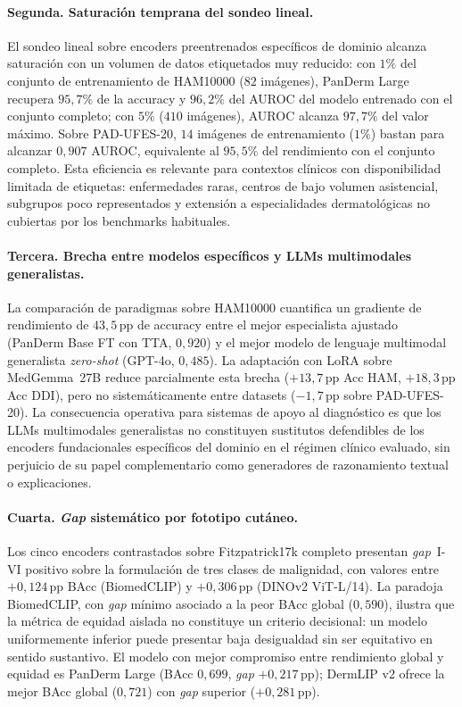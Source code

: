 \paragraph{Segunda. Saturación temprana del sondeo lineal.}
El sondeo lineal sobre encoders preentrenados específicos de
dominio alcanza saturación con un volumen de datos etiquetados muy
reducido: con $1\%$ del conjunto de entrenamiento de HAM10000
($82$ imágenes), PanDerm Large recupera $95{,}7\%$ de la
accuracy y $96{,}2\%$ del AUROC del modelo entrenado con el
conjunto completo; con $5\%$ ($410$ imágenes), AUROC alcanza
$97{,}7\%$ del valor máximo. Sobre PAD-UFES-20, $14$ imágenes
de entrenamiento ($1\%$) bastan para alcanzar $0{,}907$
AUROC, equivalente al $95{,}5\%$ del rendimiento con el conjunto
completo. Esta eficiencia es relevante para contextos clínicos con
disponibilidad limitada de etiquetas: enfermedades raras, centros
de bajo volumen asistencial, subgrupos poco representados y
extensión a especialidades dermatológicas no cubiertas por los
benchmarks habituales.

\paragraph{Tercera. Brecha entre modelos específicos y LLMs
multimodales generalistas.}
La comparación de paradigmas sobre HAM10000 cuantifica un
gradiente de rendimiento de $43{,}5$\,pp de accuracy entre el
mejor especialista ajustado (PanDerm Base FT con TTA, $0{,}920$) y el
mejor modelo de lenguaje multimodal generalista
\emph{zero-shot} (GPT-4o, $0{,}485$). La adaptación con LoRA
sobre MedGemma~27B reduce parcialmente esta brecha
($+13{,}7$\,pp Acc HAM, $+18{,}3$\,pp Acc DDI), pero no
sistemáticamente entre datasets ($-1{,}7$\,pp sobre
PAD-UFES-20). La consecuencia operativa para sistemas de apoyo al
diagnóstico es que los LLMs multimodales generalistas no
constituyen sustitutos defendibles de los encoders fundacionales
específicos del dominio en el régimen clínico evaluado, sin
perjuicio de su papel complementario como generadores de
razonamiento textual o explicaciones.

\paragraph{Cuarta. \emph{Gap} sistemático por fototipo cutáneo.}
Los cinco encoders contrastados sobre Fitzpatrick17k completo
presentan \emph{gap}~I-VI positivo sobre la formulación de tres
clases de malignidad, con valores entre $+0{,}124$\,pp BAcc
(BiomedCLIP) y $+0{,}306$\,pp (DINOv2 ViT-L/14). La paradoja
BiomedCLIP, con \emph{gap} mínimo asociado a la peor BAcc global
($0{,}590$), ilustra que la métrica de equidad aislada no
constituye un criterio decisional: un modelo uniformemente inferior
puede presentar baja desigualdad sin ser equitativo en sentido
sustantivo. El modelo con mejor compromiso entre rendimiento global
y equidad es PanDerm Large (BAcc $0{,}699$, \emph{gap}
$+0{,}217$\,pp); DermLIP v2 ofrece la mejor BAcc global
($0{,}721$) con \emph{gap} superior ($+0{,}281$\,pp).

